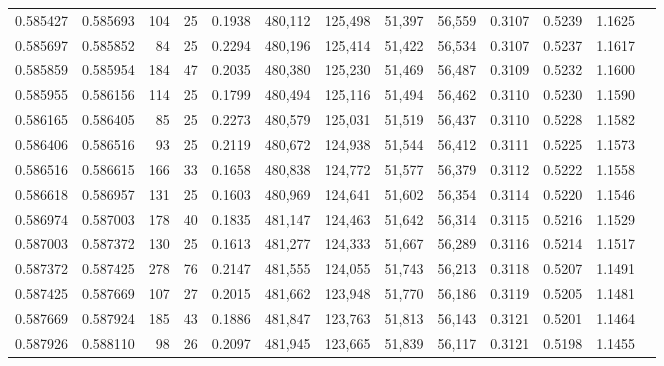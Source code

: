 \begin{tabular}{rrrrrrrrrrrrr}
0.585427 & 0.585693 &   104 &  25 &                                     0.1938 & 480,112 & 125,498 &  51,397 &  56,559 & 0.3107 & 0.5239 & 1.1625 \\
0.585697 & 0.585852 &    84 &  25 &                                     0.2294 & 480,196 & 125,414 &  51,422 &  56,534 & 0.3107 & 0.5237 & 1.1617 \\
0.585859 & 0.585954 &   184 &  47 &                                     0.2035 & 480,380 & 125,230 &  51,469 &  56,487 & 0.3109 & 0.5232 & 1.1600 \\
0.585955 & 0.586156 &   114 &  25 &                                     0.1799 & 480,494 & 125,116 &  51,494 &  56,462 & 0.3110 & 0.5230 & 1.1590 \\
0.586165 & 0.586405 &    85 &  25 &                                     0.2273 & 480,579 & 125,031 &  51,519 &  56,437 & 0.3110 & 0.5228 & 1.1582 \\
0.586406 & 0.586516 &    93 &  25 &                                     0.2119 & 480,672 & 124,938 &  51,544 &  56,412 & 0.3111 & 0.5225 & 1.1573 \\
0.586516 & 0.586615 &   166 &  33 &                                     0.1658 & 480,838 & 124,772 &  51,577 &  56,379 & 0.3112 & 0.5222 & 1.1558 \\
0.586618 & 0.586957 &   131 &  25 &                                     0.1603 & 480,969 & 124,641 &  51,602 &  56,354 & 0.3114 & 0.5220 & 1.1546 \\
0.586974 & 0.587003 &   178 &  40 &                                     0.1835 & 481,147 & 124,463 &  51,642 &  56,314 & 0.3115 & 0.5216 & 1.1529 \\
0.587003 & 0.587372 &   130 &  25 &                                     0.1613 & 481,277 & 124,333 &  51,667 &  56,289 & 0.3116 & 0.5214 & 1.1517 \\
0.587372 & 0.587425 &   278 &  76 &                                     0.2147 & 481,555 & 124,055 &  51,743 &  56,213 & 0.3118 & 0.5207 & 1.1491 \\
0.587425 & 0.587669 &   107 &  27 &                                     0.2015 & 481,662 & 123,948 &  51,770 &  56,186 & 0.3119 & 0.5205 & 1.1481 \\
0.587669 & 0.587924 &   185 &  43 &                                     0.1886 & 481,847 & 123,763 &  51,813 &  56,143 & 0.3121 & 0.5201 & 1.1464 \\
0.587926 & 0.588110 &    98 &  26 &                                     0.2097 & 481,945 & 123,665 &  51,839 &  56,117 & 0.3121 & 0.5198 & 1.1455 \\

\end{tabular}
